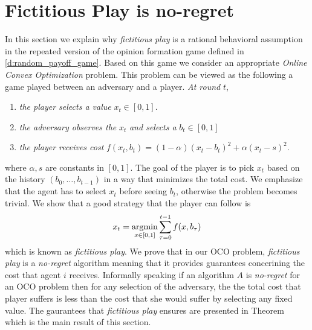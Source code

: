 \section{Fictitious Play is no-regret}\label{s:fictitious_noregret}

In this section we explain why \emph{fictitious play} is a rational behavioral assumption in
the repeated version of the opinion formation game defined in \ref{d:random_payoff_game}. Based on this
game we consider an appropriate \emph{Online Convex Optimization} problem. This problem can be viewed
as the following a game played between an adversary and a player. \emph{At round }$t$,
\begin{enumerate}
  \item \emph{the player selects a value }$x_t \in [0,1]$.
  \item \emph{the adversary observes the }$x_t$ \emph{and selects a} $b_t \in [0,1]$
  \item \emph{the player receives cost} $f(x_t,b_t)=(1-\alpha)(x_t-b_t)^2 + \alpha(x_t -s)^2$.
\end{enumerate}
where $\alpha,s$ are constants in $[0,1]$. The goal of the player is to pick $x_t$ based on the history
$(b_0,\ldots,b_{t-1})$ in a way that minimizes the total cost. We emphasize
that the agent has to select $x_t$ before seeing $b_t$, otherwise the
problem becomes trivial. We show that a good strategy that the player can follow is
\[x_t = \operatorname*{argmin}_{x \in [0,1]}\sum_{\tau=0}^{t-1}f(x,b_\tau)\]
which is known as \emph{fictitious play}. We prove that in our OCO problem,
\emph{fictitious play} is a \emph{no-regret} algorithm meaning that
it provides guarantees concerining the cost that agent $i$ receives. Informally speaking
if an algorithm $A$ is \emph{no-regret} for an OCO problem then for any selection of the
adversary, the the total cost that player suffers is less than
the cost that she would suffer by selecting any fixed value. The gaurantees that \emph{fictitious play}
ensures are presented in Theorem~\label{t:fictitious_noregret} which is the main result of this section.

